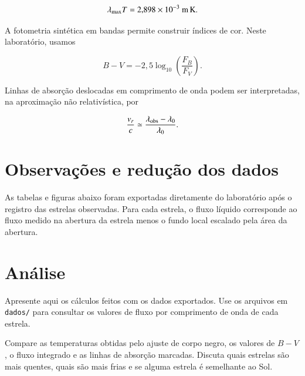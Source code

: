 \documentclass{aa}
\begin{document}
\begin{equation}
\lambda_{\max}T = 2{,}898\times 10^{-3}\ {\rm m\,K}.
\end{equation}

A fotometria sintética em bandas permite construir índices de cor. Neste laboratório, usamos

\begin{equation}
B - V = -2{,}5\log_{10}\left(\frac{F_B}{F_V}\right).
\end{equation}

Linhas de absorção deslocadas em comprimento de onda podem ser interpretadas, na aproximação não relativística, por

\begin{equation}
\frac{v_r}{c}\simeq \frac{\lambda_{\rm obs}-\lambda_0}{\lambda_0}.
\end{equation}

\section{Observações e redução dos dados}

As tabelas e figuras abaixo foram exportadas diretamente do laboratório após o registro das estrelas observadas. Para cada estrela, o fluxo líquido corresponde ao fluxo medido na abertura da estrela menos o fundo local escalado pela área da abertura.









\section{Análise}

Apresente aqui os cálculos feitos com os dados exportados. Use os arquivos em \texttt{dados/} para consultar os valores de fluxo por comprimento de onda de cada estrela.

Compare as temperaturas obtidas pelo ajuste de corpo negro, os valores de $B-V$, o fluxo integrado e as linhas de absorção marcadas. Discuta quais estrelas são mais quentes, quais são mais frias e se alguma estrela é semelhante ao Sol.

\end{document}
